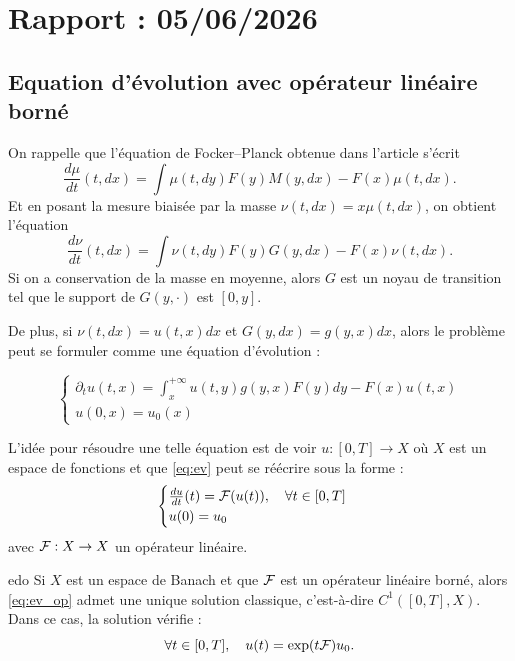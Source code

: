 \section{Rapport : 05/06/2026}
\subsection{Equation d'évolution avec opérateur linéaire borné}

On rappelle que l'équation de Focker--Planck obtenue dans l'article \cite{frag_deaconu} s'écrit
\begin{equation}
	\frac{d\mu}{dt}(t,dx) = \int \mu(t,dy) F(y) M(y,dx) - F(x) \mu(t,dx).
	\label{eq:fock}
\end{equation}
Et en posant la mesure biaisée par la masse $\nu(t,dx) = x\mu(t,dx)$, on obtient l'équation
\begin{equation}
	\frac{d\nu}{dt}(t,dx) = \int \nu(t,dy) F(y) G(y,dx) - F(x) \nu(t,dx).
	\label{eq:fock_mass}
\end{equation}
Si on a conservation de la masse en moyenne, alors $G$ est un noyau de transition tel que le support
de $G(y, \cdot)$ est $[0,y]$.

De plus, si $\nu(t,dx) = u(t,x) dx$ et $G(y,dx) = g(y,x) dx$, alors le problème peut se formuler
comme une équation d'évolution :

\begin{equation}
	\begin{cases}
		\partial_t u(t,x) = \int_x^{+\infty} u(t,y) g(y,x) F(y) dy - F(x) u(t,x) \\
		u(0,x) = u_0(x)
	\end{cases}
	\label{eq:ev}
\end{equation}

\begin{important}
	L'idée pour résoudre une telle équation est de voir $u : [0,T] \to X$ où $X$ est un espace de fonctions et que \ref{eq:ev}
	peut se réécrire sous la forme :
	\begin{equation}
		\begin{cases}
			\frac{du}{dt}(t) = \mathcal{F}(u(t)), \quad \forall t \in [0,T] \\
			u(0) = u_0
		\end{cases}
		\label{eq:ev_op}
	\end{equation}
	avec $\mathcal{F} : X \to X$ un opérateur linéaire.
\end{important}

\begin{thm}{}{edo}
	Si $X$ est un espace de Banach et que $\mathcal{F}$ est un opérateur linéaire borné, alors \ref{eq:ev_op} admet une unique solution classique, c'est-à-dire
	$C^1([0,T], X)$. Dans ce cas, la solution vérifie :
	\[
		\forall t \in [0,T], \quad u(t) = \exp(t \mathcal{F})u_0.
	\]
\end{thm}

